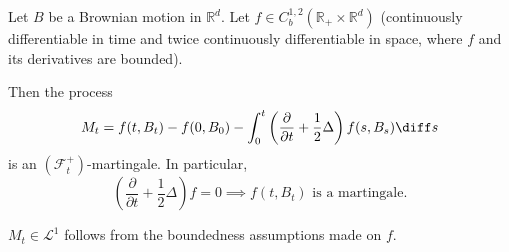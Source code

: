 \documentclass[12pt]{article}
\begin{document}

\begin{theorem}
	Let $B$ be a Brownian motion in $\mathbb{R}^d$. Let $f \in C_b^{1,2}(\mathbb{R}_+ \times \mathbb{R}^d)$ (continuously differentiable in time and twice continuously differentiable in space, where $f$ and its derivatives are bounded).

	Then the process
	\[
	M_t = f(t, B_t) - f(0, B_0) - \int_0^t \left( \frac{\partial}{\partial t} + \frac 12 \Delta \right) f(s, B_s) \diff s
	\]
	is an $(\mathcal{F}_t^+)$-martingale. In particular,
	\[
		\left( \frac{\partial}{\partial t} + \frac 12 \Delta\right) f = 0 \implies f(t, B_t) \text{ is a martingale}.
	\]
\end{theorem}

\begin{proofbox}
	$M_t \in \mathcal{L}^1$ follows from the boundedness assumptions made on $f$.


\end{proofbox}
\end{document}
